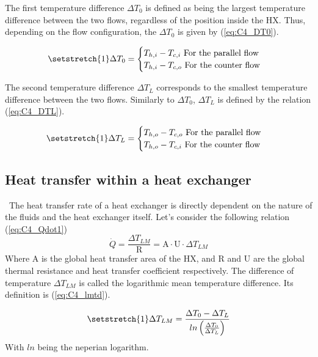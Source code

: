 The first temperature difference \(\Delta T_0\) is defined as being the largest temperature difference between the two flows, regardless of the position inside the HX. Thus, depending on the flow configuration, the \(\Delta T_0\) is given by (\ref{eq:C4_DT0}).

\begin{equation}
    \setstretch{1}
    \Delta T_0 =
    \begin{cases}
        T_{h,i} - T_{c,i} \text{ For the parallel flow} \\
        T_{h,i} - T_{c,o} \text{ For the counter flow}  \\
    \end{cases}\label{eq:C4_DT0}
\end{equation}

The second temperature difference \(\Delta T_L\) corresponds to the smallest temperature difference between the two flows. Similarly to \(\Delta T_0\), \(\Delta T_L\) is defined by the relation (\ref{eq:C4_DTL}).

\begin{equation}
    \setstretch{1}
    \Delta T_L =
    \begin{cases}
        T_{h,o} - T_{c,o} \text{ For the parallel flow} \\
        T_{h,o} - T_{c,i} \text{ For the counter flow}  \\
    \end{cases}\label{eq:C4_DTL}
\end{equation}

\subsection{Heat transfer within a heat exchanger}
\quad\ The heat transfer rate of a heat exchanger is directly dependent on the nature of the fluids and the heat exchanger itself. Let's consider the following relation (\ref{eq:C4_Qdot1})
\begin{equation}
    \dot{Q} = \frac{\Delta T_{LM}}{\mathrm{R}}= \mathrm{A}\cdot \mathrm{U}\cdot \Delta T_{LM}\label{eq:C4_Qdot1}
\end{equation}
Where \(\mathrm{A}\) is the global heat transfer area of the HX, and \(\mathrm{R}\) and \(\mathrm{U}\) are the global thermal resistance and heat transfer coefficient respectively. The difference of temperature \(\Delta T_{LM}\) is called the logarithmic mean temperature difference. Its definition is (\ref{eq:C4_lmtd}).


\begin{equation}
    \setstretch{1}
    \Delta T_{LM} = \frac{\Delta T_0-\Delta T_L}{ln\left(\frac{\Delta T_0}{\Delta T_L}\right)}\label{eq:C4_lmtd}
\end{equation}
With \(ln\) being the neperian logarithm.
